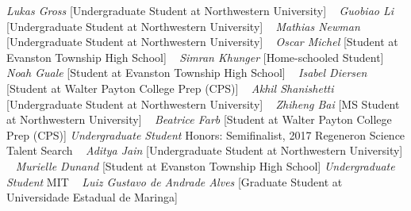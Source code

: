 \GapNoBreak
{}
\textit{Lukas Gross}
    [Undergraduate Student at Northwestern University]
\newline
~
\Gap{}
\textit{Guobiao Li}
    [Undergraduate Student at Northwestern University]
\newline
~
\Gap{}
\textit{Mathias Newman}
    [Undergraduate Student at Northwestern University]
\newline
~
\Gap{}
\textit{Oscar Michel}
    [Student at Evanston Township High School]
\newline
~
\Gap{}
\textit{Simran Khunger}
    [Home-schooled Student]
\newline
~
\Gap{}
\textit{Noah Guale}
    [Student at Evanston Township High School]
\newline
~
\Gap{}
\textit{Isabel Diersen}
    [Student at Walter Payton College Prep (CPS)]
\newline
~
\Gap{}
\textit{Akhil Shanishetti}
    [Undergraduate Student at Northwestern University]
\newline
~
\Gap{}
\textit{Zhiheng Bai}
    [MS Student at Northwestern University]
\newline
~
\Gap{}
\textit{Beatrice Farb}
    [Student at Walter Payton College Prep (CPS)]
\newline
    \textit{Undergraduate Student}
    \newline
    {\footnotesize Honors: Semifinalist, 2017 Regeneron Science Talent Search}
    \newline
~
\Gap{}
\textit{Aditya Jain}
    [Undergraduate Student at Northwestern University]
\newline
~
\Gap{}
\textit{Murielle Dunand}
    [Student at Evanston Township High School]
\newline
    \textit{Undergraduate Student}
    \newline
    MIT
    \newline
~
\Gap{}
\textit{Luiz Gustavo de Andrade Alves}
    [Graduate Student at Universidade Estadual de Maringa]
\newline
~
\Gap{}
